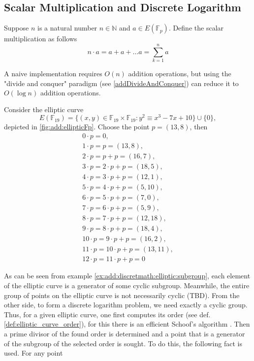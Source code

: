 \subsection{Scalar Multiplication and Discrete Logarithm}

Suppose $n$ is a natural number $n \in \mathbb{N}$ and $a \in E\left(\mathbb{F}_p\right)$. Define the scalar multiplication as follows
\[
n \cdot a = a + a + \dots a = \sum_{k=1}^n a
\] 

A naive implementation requires $O\left(n\right)$ addition operations, but using the "divide and conquer" paradigm (see \autoref{addDivideAndConquer}) can reduce it to $O\left(\log n\right)$ addition operations.

\begin{example}
Consider the elliptic curve 
\[
E\left(\mathbb{F}_{19}\right) = 
\{(x,y) \in \mathbb{F}_{19} \times \mathbb{F}_{19}: y^2 \equiv x^3 -7 x +
10 \} \cup \{0\}, 
\] 
depicted in \autoref{fig:add:ellipticFp}. Choose
the point $p = (13, 8)$, then 
\begin{eqnarray}
0 \cdot p = 0, \nonumber \\
1 \cdot p = p = (13,8), \nonumber \\
2 \cdot p = p + p = (16,7), \nonumber \\
3 \cdot p = 2 \cdot p + p = (18,5), \nonumber \\
4 \cdot p = 3 \cdot p + p = (12,1), \nonumber \\
5 \cdot p = 4 \cdot p + p = (5,10), \nonumber \\
6 \cdot p = 5 \cdot p +p = (7,0), \nonumber \\
7 \cdot p = 6 \cdot p + p = (5,9), \nonumber \\
8 \cdot p = 7 \cdot p +p = (12,18), \nonumber \\
9 \cdot p = 8 \cdot p + p = (18,4), \nonumber \\
10 \cdot p = 9 \cdot p + p = (16,2), \nonumber \\
11 \cdot p = 10 \cdot p + p = (13,11), \nonumber \\
12 \cdot p = 11 \cdot p + p = 0
\nonumber 
\end{eqnarray}
\label{ex:add:discretmath:elliptic:subgroup}
\end{example}
As can be seen from example \ref{ex:add:discretmath:elliptic:subgroup}, each element of the elliptic curve is a generator of some cyclic subgroup. Meanwhile, the entire group of points on the elliptic curve is not necessarily cyclic 
(TBD).
From the other side, to form a discrete logarithm problem, we need exactly a cyclic group. Thus, for a given elliptic curve, one first computes its order (see def. \ref{def:elliptic_curve_order}), for this there is an efficient Schoof's algorithm \cite{ReneSchoof:1985}. Then a prime divisor of the found order is determined and a point that is a generator of the subgroup of the selected order is sought. To do this, the following fact is used. For any point 
